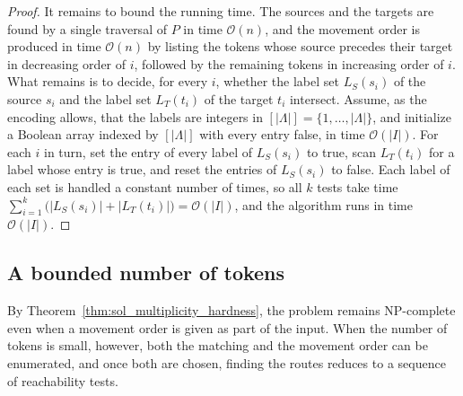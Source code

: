 \documentclass[a4paper,USenglish,thm-restate]{lipics-v2021}
\theoremstyle{problemstyle}
\begin{document}
\begin{proof}
It remains to bound the running time. The sources and the targets are found
by a single traversal of $P$ in time $\mathcal{O}(n)$, and the movement order
is produced in time $\mathcal{O}(n)$ by listing the tokens whose source
precedes their target in decreasing order of $i$, followed by the remaining
tokens in increasing order of $i$. What remains is to decide, for every $i$,
whether the label set $L_S(s_i)$ of the source $s_i$ and the label set
$L_T(t_i)$ of the target $t_i$ intersect. Assume, as the encoding allows,
that the labels are integers in $[|\Lambda|]=\{1,\ldots,|\Lambda|\}$, and
initialize a Boolean array indexed by $[|\Lambda|]$ with every entry false,
in time $\mathcal{O}(|I|)$. For each $i$ in turn, set the entry of every
label of $L_S(s_i)$ to true, scan $L_T(t_i)$ for a label whose entry is
true, and reset the entries of $L_S(s_i)$ to false. Each label of each set is
handled a constant number of times, so all $k$ tests take time
$\sum_{i=1}^{k}\bigl(|L_S(s_i)|+|L_T(t_i)|\bigr)=\mathcal{O}(|I|)$, and the
algorithm runs in time $\mathcal{O}(|I|)$.
\end{proof}


\subsection{A bounded number of tokens}
\label{sec:tokens}

By Theorem~\ref{thm:sol_multiplicity_hardness}, the problem remains
\textsf{NP}-complete even when a movement order is given as part of the
input. When the number of tokens is small, however, both the matching and the
movement order can be enumerated, and once both are chosen, finding the routes
reduces to a sequence of reachability tests.

\tokenNumberFpt*
\end{document}
